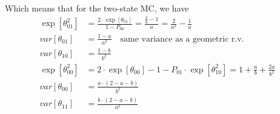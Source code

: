 Which means that for the two-state MC, we have
\begin{equation} \begin{split}
	\exp[\theta_{01}^2] &= \frac{2 \cdot \exp[\theta_{01}]}{1-P_{00}} = \frac{\frac{2}{a}-1}{a} = \frac{2}{a^2} - \frac{1}{a}\\
	var[\theta_{01}] &= \frac{1-a}{a^2} \quad \text{same variance as a geometric r.v.} \\
	var[\theta_{10}] &= \frac{1-b}{b^2}\\
	\exp[\theta_{00}^2] &= 2 \cdot \exp[\theta_{00}]  -1 - P_{01}\cdot \exp[\theta_{10}^2] = 1 + \frac{a}{b} + \frac{2a}{b^2} \\
	var[\theta_{00}] &= \frac{a \cdot(2-a-b)}{b^2}\\
	var[\theta_{11}] &= \frac{b\cdot(2-a-b)}{a^2}\\
\end{split}\end{equation}

